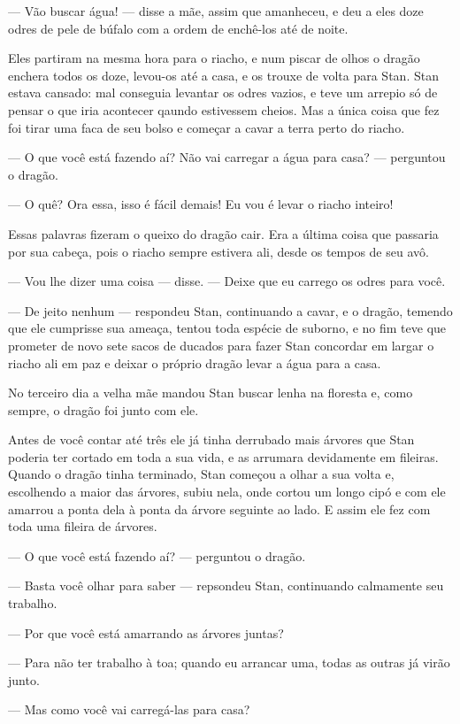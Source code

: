 — Vão buscar água! — disse a mãe, assim que amanheceu, e deu a eles
doze odres de pele de búfalo com a ordem de enchê-los até de noite.

Eles partiram na mesma hora para o riacho, e num piscar de olhos o
dragão enchera todos os doze, levou-os até a casa, e os trouxe de
volta para Stan. Stan estava cansado: mal conseguia levantar os odres
vazios, e teve um arrepio só de pensar o que iria acontecer qaundo
estivessem cheios. Mas a única coisa que fez foi tirar uma faca de
seu bolso e começar a cavar a terra perto do riacho.

— O que você está fazendo aí? Não vai carregar a água para casa? —
perguntou o dragão.

— O quê? Ora essa, isso é fácil demais! Eu vou é levar o riacho
inteiro!

Essas palavras fizeram o queixo do dragão cair. Era a última coisa que
passaria por sua cabeça, pois o riacho sempre estivera ali, desde os
tempos de seu avô.

— Vou lhe dizer uma coisa — disse. — Deixe que eu carrego os odres
para você.

— De jeito nenhum — respondeu Stan, continuando a cavar, e o dragão,
temendo que ele cumprisse sua ameaça, tentou toda espécie de suborno,
e no fim teve que prometer de novo sete sacos de ducados para fazer
Stan concordar em largar o riacho ali em paz e deixar o próprio
dragão levar a água para a casa.

No terceiro dia a velha mãe mandou Stan buscar lenha na floresta e,
como sempre, o dragão foi junto com ele.

Antes de você contar até três ele já tinha derrubado mais árvores que
Stan poderia ter cortado em toda a sua vida, e as arrumara
devidamente em fileiras. Quando o dragão tinha terminado, Stan
começou a olhar a sua volta e, escolhendo a maior das árvores, subiu
nela, onde cortou um longo cipó e com ele amarrou a ponta dela à
ponta da árvore seguinte ao lado. E assim ele fez com toda uma
fileira de árvores.

— O que você está fazendo aí? — perguntou o dragão.

— Basta você olhar para saber — repsondeu Stan, continuando calmamente
seu trabalho.

— Por que você está amarrando as árvores juntas?

— Para não ter trabalho à toa; quando eu arrancar uma, todas as outras
já virão junto. 

— Mas como você vai carregá-las para casa?

